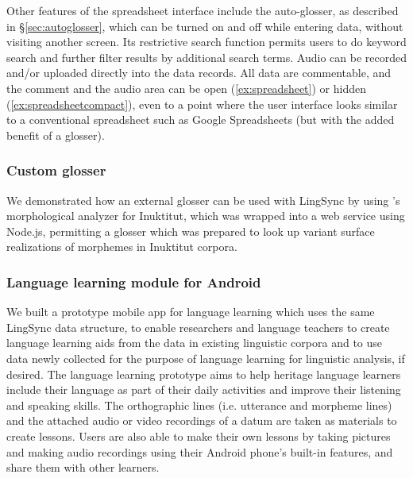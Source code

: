 \documentclass[letterpaper, 12pt, dvips]{mitwpl}
\begin{document}
Other features of the spreadsheet interface include the auto-glosser, as described in \S\ref{sec:autoglosser}, which can be turned on and off while entering data, without visiting another screen.  Its restrictive search function permits users to do keyword search and further filter results by additional search terms. Audio can be recorded and/or  uploaded directly into the data records. All data are commentable, and the comment and the audio area can be  open  (\ref{ex:spreadsheet}) or hidden  (\ref{ex:spreadsheetcompact}), even to a point where the user interface looks similar to a conventional spreadsheet such as Google Spreadsheets (but with the added benefit of a glosser). 


\subsubsection{Custom glosser}

We demonstrated how an external glosser can be used with LingSync by using \cite{Farley:2014:Online}'s morphological analyzer for Inuktitut, which was wrapped into a web service using Node.js, permitting a glosser which was prepared to look up variant  surface realizations of morphemes in Inuktitut corpora.%

\subsubsection{Language learning module for Android}

We built a prototype mobile app for language learning which uses the same LingSync data structure, to enable researchers and language teachers to create language learning aids from the data in existing linguistic corpora and to use data newly collected for the purpose of language learning for linguistic analysis, if desired.
The language learning prototype aims to help heritage language learners include their language as part of their daily activities and improve their listening and speaking skills.
The orthographic lines (i.e.
utterance and morpheme lines) and the attached audio or video recordings of a datum are taken as materials to create lessons. Users are also able to make their own lessons by taking pictures and making audio recordings using their Android phone's built-in features, and share them with other learners.
\end{document}
